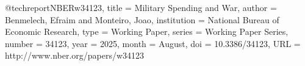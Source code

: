 @techreport{NBERw34123,
  title       = {Military Spending and War},
  author      = {Benmelech, Efraim and Monteiro, Joao},
  institution = {National Bureau of Economic Research},
  type        = {Working Paper},
  series      = {Working Paper Series},
  number      = {34123},
  year        = {2025},
  month       = {August},
  doi         = {10.3386/34123},
  URL         = {http://www.nber.org/papers/w34123}
}
